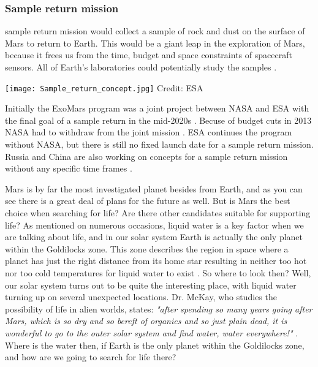 \begin{multicols}{2}
\subsubsection{Sample return mission}

 sample return mission would collect a sample of rock and dust on the surface of Mars to return to Earth.
This would be a giant leap in the exploration of Mars, because it frees us from the time, budget and space constraints of spacecraft sensors.
All of Earth's laboratories could potentially study the samples \cite{EarthAnalysis}.
 
\begin{center}
	\texttt{[image: Sample\_return\_concept.jpg]}
	\tiny{Credit: ESA}
\end{center}

Initially the ExoMars program was a joint project between NASA and ESA with the final goal of a sample return in the mid-2020s \cite{FPlan15}.
Becuse of budget cuts in 2013 NASA had to withdraw from the joint mission \cite{FPlan16}.
ESA continues the program without NASA, but there is still no fixed launch date for a sample return mission.
Russia and China are also working on concepts for a sample return mission without any specific time frames \cite{RussiaPlan} \cite{ChinaPlan}.

Mars is by far the most investigated planet besides from Earth, and as you can see there is a great deal of plans for the future as well.
But is Mars the best choice when searching for life?
Are there other candidates suitable for supporting life? 
As mentioned on numerous occasions, liquid water is a key factor when we are talking about life, and in our solar system Earth is actually the only planet within the Goldilocks zone.
This zone describes the region in space where a planet has just the right distance from its home star resulting in neither too hot nor too cold temperatures for liquid water to exist \cite{FPlan26}.
So where to look then?
Well, our solar system turns out to be quite the interesting place, with liquid water turning up on several unexpected locations. 
Dr. McKay, who studies the possibility of life in alien worlds, states: \emph{"after spending so many years going after Mars, which is so dry and so bereft of organics and so just plain dead, it is wonderful to go to the outer solar system and find water, water everywhere!"} \cite{FPlan09}.
Where is the water then, if Earth is the only planet within the Goldilocks zone, and how are we going to search for life there?


\end{multicols}
